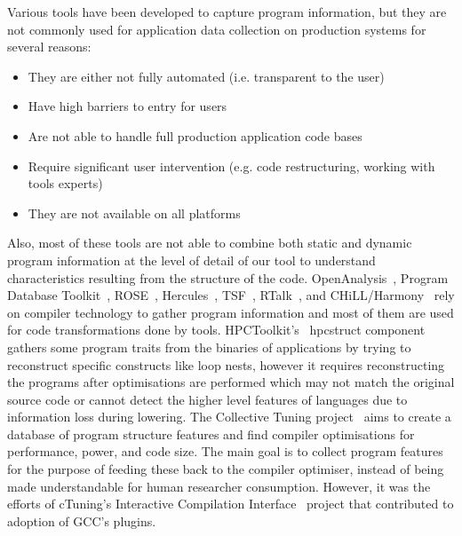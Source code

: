 Various tools have been developed to capture program information, but they are not commonly used for application data collection on production systems for several reasons:
\begin{itemize}
\item They are either not fully automated (i.e. transparent to the user)
\item Have high barriers to entry for users
\item Are not able to handle full production application code bases
\item Require significant user intervention (e.g. code restructuring, working with tools experts)
\item They are not available on all platforms
\end{itemize}
Also, most of these tools are not able to combine both static and dynamic program information at the level of detail of our tool to understand characteristics resulting from the structure of the code.
OpenAnalysis~\cite{Strout:2005}, Program Database Toolkit~\cite{Lindlan2000}, ROSE~\cite{Willcock:2009:RGP:1621607.1621611}, Hercules~\cite{kartsaklis2012hercules}, TSF~\cite{bodin1998user}, RTalk~\cite{SPE:SPE1035}, and CHiLL/Harmony~\cite{tiwari2009scalable} rely on compiler technology to gather program information and most of them are used for code transformations done by tools.
HPCToolkit's~\cite{Adhianto2010} hpcstruct component gathers some program traits from the binaries of applications by trying to reconstruct specific constructs like loop nests, however it requires reconstructing the programs after optimisations are performed which may not match the original source code or cannot detect the higher level features of languages due to information loss during lowering.
The Collective Tuning project~\cite{Fursin:2016} aims to create a database of program structure features and find compiler optimisations for performance, power, and code size.
The main goal is to collect program features for the purpose of feeding these back to the compiler optimiser, instead of being made understandable for human researcher consumption.
However, it was the efforts of cTuning's Interactive Compilation Interface~\cite{ctuning-ici} project that contributed to adoption of \acs{GCC}'s plugins. 

